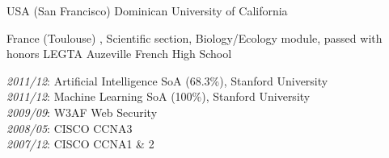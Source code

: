 \documentclass[english]{ecv}
\makeatletter
\renewcommand{\ecvBSec}[2][\ecv@lang]{%
  \ifthenelse{\equal{#1}{\ecv@lang}}{%
    \tabularnewline%
    \ecvLeft{\textsc{\Large{\textcolor{ecv@ColBlue}{#2}}} \medskip } &%
    \tabularnewline%
  }{}%
}
\makeatother
\begin{document}
\begin{ecv}
 {USA (San Francisco)}
                {}
                {Dominican University of California}

 {France (Toulouse)}
                {, Scientific section, Biology/Ecology
                module, passed with honors}
                {LEGTA Auzeville French High School}

\ecvPageBreak

                {\textit{2011/12}: Artificial Intelligence SoA (68.3\%), Stanford University\\
                \textit{2011/12}: Machine Learning  SoA (100\%), Stanford University\\
                \textit{2009/09}: W3AF Web Security\\
                \textit{2008/05}: CISCO CCNA3\\
                \textit{2007/12}: CISCO CCNA1 \& 2}

             

             



\ecvBSec{\hypertarget{hypertarget:\ecvJobs}{\ecvJobs}}


\end{ecv}
\end{document}
